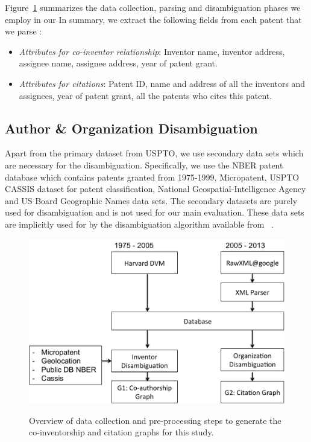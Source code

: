 Figure~\ref{process} summarizes the data collection, parsing and disambiguation phases we employ in our 
In summary, we extract the following fields from each patent that we parse :

\begin{itemize}
\item {\em Attributes for co-inventor relationship}:
Inventor name, inventor address, assignee name, assignee address, year of patent grant.

\item {\em Attributes for citations}:
Patent ID, name and address of all the inventors and assignees, year of patent grant, all the patents who cites this patent.
\end{itemize}


\subsection{Author \& Organization Disambiguation}

Apart from the primary dataset from USPTO, we use secondary data sets which are necessary for the disambiguation. Specifically, we use the NBER patent database which contains patents granted from 1975-1999, Micropatent, USPTO CASSIS dataset for patent classification, National Geospatial-Intelligence Agency and US Board Geographic Names data sets. The secondary datasets are purely used for disambiguation and is not used for our main evaluation. These data sets are implicitly used for by the disambiguation algorithm available from ~\cite{harvard-dismbi}.

\begin{figure}[H]
		  \centering	
          \includegraphics[scale=0.6]{../figures/process.pdf}
          \label{process}
          \caption{Overview of data collection and pre-processing steps to generate the co-inventorship and citation graphs for this study.}
\end{figure}



